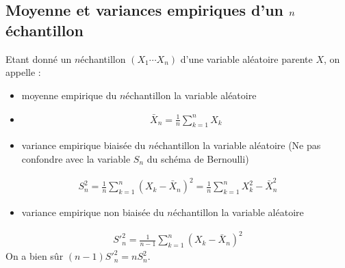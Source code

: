 \documentclass[letterpaper,10pt,french]{sphinxmanual}
\begin{document}
\subsection{Moyenne et variances empiriques d’un \protect\(n\protect\)\sphinxhyphen{}échantillon}
\label{\detokenize{elemstats:moyenne-et-variances-empiriques-d-un-n-echantillon}}
\sphinxAtStartPar
Etant donné un \(n\)\sphinxhyphen{}échantillon \((X_1\cdots X_n)\) d’une variable aléatoire parente \(X\), on appelle :

\ignorespaces 
{}\ignorespaces \begin{itemize}
\item {} 
\sphinxAtStartPar
moyenne empirique du \(n\)\sphinxhyphen{}échantillon la variable aléatoire

\item {} \begin{equation*}
\begin{split}\bar{X}_n=\frac1n \displaystyle\sum_{k=1}^n X_k\end{split}
\end{equation*}
\item {} 
\sphinxAtStartPar
variance empirique biaisée du \(n\)\sphinxhyphen{}échantillon la variable aléatoire (Ne pas confondre avec la variable \(S_n\) du schéma de Bernoulli)

\end{itemize}
\begin{equation*}
\begin{split}S_n^2=\frac1n \displaystyle\sum_{k=1}^n (X_k-\bar{X}_n)^2=\frac1n \displaystyle\sum_{k=1}^n X_k^2 -\bar{X}_n^2\end{split}
\end{equation*}\begin{itemize}
\item {} 
\sphinxAtStartPar
variance empirique non biaisée du \(n\)\sphinxhyphen{}échantillon la variable aléatoire

\end{itemize}
\begin{equation*}
\begin{split}{S'}_n^2=\frac{1}{n-1} \displaystyle\sum_{k=1}^n (X_k-\bar{X}_n)^2\end{split}
\end{equation*}
\sphinxAtStartPar
On a bien sûr \((n-1){S'}_n^2=nS_n^2\).
\end{document}
